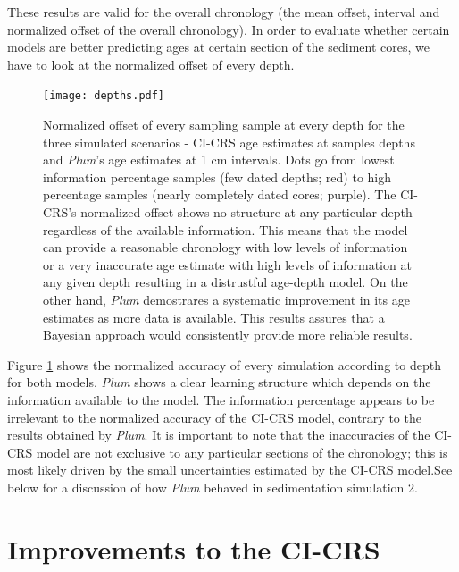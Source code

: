 \documentclass [10pt] {article}
\begin{document}
These results are valid for the overall chronology (the mean offset, interval and normalized offset of the overall chronology). 
In order to evaluate whether certain models are better predicting ages at certain section of the sediment cores, we have to look at the normalized offset of every depth. 





\begin{figure}[!]
	\begin{centering}
		\texttt{[image: depths.pdf]}
		\caption{Normalized offset of every sampling sample at every depth for the three simulated scenarios - CI-CRS age estimates at samples depths and \textit{Plum}'s age estimates at 1 cm intervals. Dots go from lowest information percentage samples (few dated depths; red) to high percentage samples (nearly completely dated cores; purple). The CI-CRS's normalized offset shows no structure at any particular depth regardless of the available information. This means that the model can provide a reasonable chronology with low levels of information or a very inaccurate age estimate with high levels of information at any given depth resulting in a distrustful age-depth model. On the other hand, \textit{Plum} demostrares a systematic improvement in its age estimates as more data is available. This results assures that a Bayesian approach would consistently provide more reliable results.     }
		\label{fig:depths}
	\end{centering}
\end{figure}

Figure \ref{fig:depths} shows the normalized accuracy of every simulation according to depth for both models.
\textit{Plum} shows a clear learning structure which depends on the information available to the model.
The information percentage appears to be irrelevant to the normalized accuracy of the CI-CRS model, contrary to the results obtained by \textit{Plum}.
It is important to note that the inaccuracies of the CI-CRS model are not exclusive to any particular sections of the chronology; this is most likely driven by the small uncertainties estimated by the CI-CRS model.See below for a discussion of how \textit{Plum} behaved in sedimentation simulation 2.   



\section{Improvements to the CI-CRS}
\end{document}
